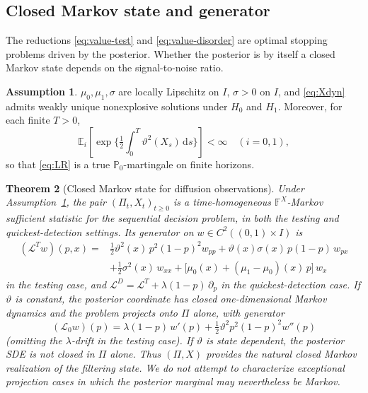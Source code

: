 \documentclass[pdflatex,sn-mathphys-num]{sn-jnl}
\theoremstyle{plain}
\newtheorem{theorem}{Theorem}
\theoremstyle{definition}
\newtheorem{assumption}[theorem]{Assumption}
\newcommand{\E}{\mathbb{E}}
\newcommand{\PR}{\mathbb{P}}
\newcommand{\Filt}{\mathbb{F}}
\newcommand{\Lgen}{\mathscr{L}}
\newcommand{\dd}{\,\mathrm{d}}
\newcommand{\snr}{\vartheta}
\newcommand{\post}{\Pi}
\begin{document}
\subsection{Closed Markov state and generator}\label{sec:closed}
The reductions \eqref{eq:value-test} and \eqref{eq:value-disorder} are optimal
stopping problems driven by the posterior. Whether the posterior is by itself a
closed Markov state depends on the signal-to-noise ratio.

\begin{assumption}\label{ass:coeff}
$\mu_0,\mu_1,\sigma$ are locally Lipschitz on $I$, $\sigma>0$ on $I$, and
\eqref{eq:Xdyn} admits weakly unique nonexplosive solutions under $H_0$ and
$H_1$. Moreover, for each finite $T>0$,
\[
  \E_i\!\left[\exp\Big\{\tfrac12\int_0^T\snr^2(X_s)\dd s\Big\}\right]<\infty
  \quad(i=0,1),
\]
so that \eqref{eq:LR} is a true $\PR_0$-martingale on finite horizons.
\end{assumption}

\begin{theorem}[Closed Markov state for diffusion observations]\label{thm:closed}
Under Assumption~\ref{ass:coeff}, the pair $(\post_t,X_t)_{t\ge0}$ is a
time-homogeneous $\Filt^X$-Markov sufficient statistic for the sequential
decision problem, in both the testing and quickest-detection settings. Its
generator on $w\in C^2((0,1)\times I)$ is
\begin{equation}\label{eq:genT}
\begin{aligned}
  (\Lgen^{T}w)(p,x)
  ={}&\tfrac12\snr^2(x)\,p^2(1-p)^2 w_{pp}
   +\snr(x)\sigma(x)\,p(1-p)\,w_{px}\\
   &+\tfrac12\sigma^2(x)\,w_{xx}
   +\big[\mu_0(x)+(\mu_1-\mu_0)(x)\,p\big]\,w_x
\end{aligned}
\end{equation}
in the testing case, and $\Lgen^{D}=\Lgen^{T}+\lambda(1-p)\,\partial_p$ in the
quickest-detection case. If $\snr$ is constant, the posterior coordinate has
closed one-dimensional Markov dynamics and the problem projects onto $\post$
alone, with generator
\begin{equation}\label{eq:gen-1d}
  (\Lgen_0 w)(p)=\lambda(1-p)\,w'(p)+\tfrac12\snr^2 p^2(1-p)^2 w''(p)
\end{equation}
(omitting the $\lambda$-drift in the testing case). If $\snr$ is state dependent,
the posterior SDE is not closed in $\post$ alone. Thus $(\post,X)$ provides the
natural closed Markov realization of the filtering state. We do not attempt to
characterize exceptional projection cases in which the posterior marginal may
nevertheless be Markov.
\end{theorem}
\end{document}
